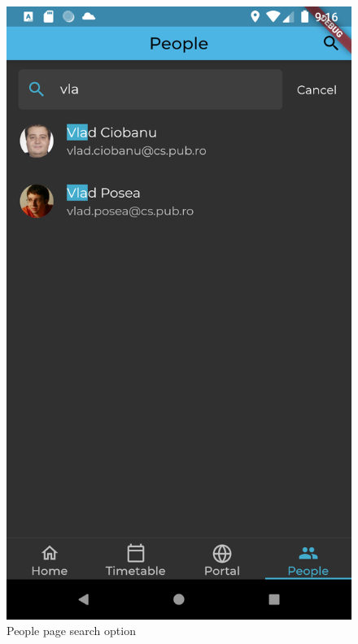 \begin{figure}[!ht]
        \hfill
        \begin{minipage}[t]{0.315\textwidth}
            \captionsetup{justification=centering}
            \includegraphics[width=\textwidth]{figures/app/final/people_search.png}
            \caption{People page search option}
            \label{4:fig:people_search}
        \end{minipage}
    \end{figure}

